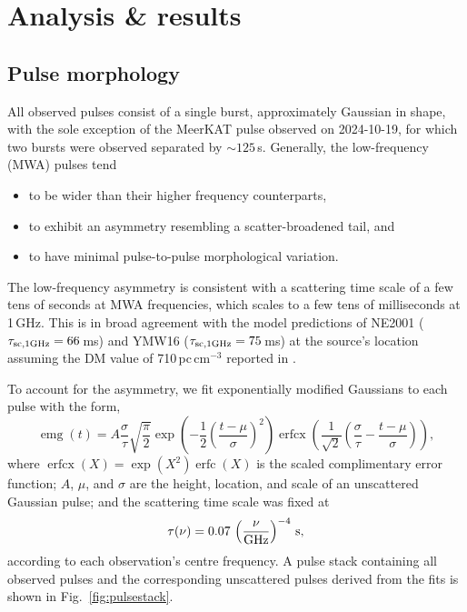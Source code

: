 \documentclass[fleqn,usenatbib]{mnras}
\DeclareMathOperator{\erfcx}{erfcx}
\DeclareMathOperator{\erfc}{erfc}
\DeclareMathOperator{\emg}{emg}
\newcommand{\Fig}{Fig.}
\begin{document}
\section{Analysis \& results} \label{sec:analysis}

\subsection{Pulse morphology}

All observed pulses consist of a single burst, approximately Gaussian in shape, with the sole exception of the MeerKAT pulse observed on 2024-10-19, for which two bursts were observed separated by ${\sim}125\,$s.
Generally, the low-frequency (MWA) pulses tend
\begin{itemize}
    \item to be wider than their higher frequency counterparts,
    \item to exhibit an asymmetry resembling a scatter-broadened tail, and
    \item to have minimal pulse-to-pulse morphological variation.
\end{itemize}

The low-frequency asymmetry is consistent with a scattering time scale of a few tens of seconds at MWA frequencies, which scales to a few tens of milliseconds at 1\,GHz.
This is in broad agreement with the model predictions of NE2001 ($\tau_{\rm sc,1GHz} = 66\,$ms) and YMW16 ($\tau_{\rm sc,1 GHz} = 75\,$ms) at the source's location assuming the DM value of 710\,pc\,cm$^{-3}$ reported in .

To account for the asymmetry, we fit exponentially modified Gaussians to each pulse with the form,
\begin{equation}
  \emg(t) = A \frac{\sigma}{\tau}\sqrt{\frac{\pi}{2}}
    \exp\left(-\frac12 \left( \frac{t - \mu}{\sigma} \right)^2 \right)  \erfcx \left(\frac{1}{\sqrt{2}} \left(\frac{\sigma}{\tau} - \frac{t - \mu}{\sigma} \right) \right),
  \label{eqn:emg}
\end{equation}
where $\erfcx(X) = \exp(X^2) \erfc(X)$ is the scaled complimentary error function; $A$, $\mu$, and $\sigma$ are the height, location, and scale of an unscattered Gaussian pulse; and the scattering time scale was fixed at
\begin{equation}
      \tau(\nu) = 0.07\, \left(\frac{\nu}{\rm GHz}\right)^{-4} \, {\rm s},
\end{equation}
according to each observation's centre frequency.
A pulse stack containing all observed pulses and the corresponding unscattered pulses derived from the fits is shown in \Fig~\ref{fig:pulsestack}.
\end{document}
